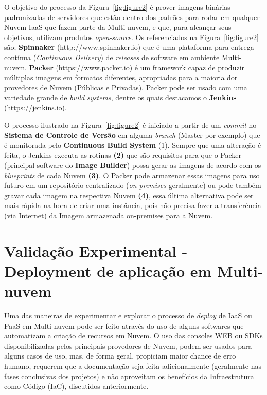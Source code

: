 \documentclass[12pt]{article}
\begin{document}
	O objetivo do processo da Figura~\ref{fig:figure2} é prover imagens binárias padronizadas de servidores que estão dentro dos padrões para rodar em qualquer Nuvem IaaS que fazem parte da Multi-nuvem, e que, para alcançar seus objetivos, utilizam produtos \textit{open-source}. Os referenciados na Figura~\ref{fig:figure2} são; \textbf{Spinnaker} (http://www.spinnaker.io) que é uma plataforma para entrega contínua (\textit{Continuous Delivery}) de \textit{releases} de software em ambiente Multi-nuvem. \textbf{Packer} (https://www.packer.io) é um framework capaz de produzir múltiplas imagens em formatos diferentes, apropriadas para a maioria dor provedores de Nuvem (Públicas e Privadas). Packer pode ser usado com uma variedade grande de \textit{build systems}, dentre os quais destacamos o \textbf{Jenkins} (https://jenkins.io).

	O processo ilustrado na Figura~\ref{fig:figure2} é iniciado a partir de um \textit{commit} no \textbf{Sistema de Controle de Versão} em alguma \textit{branch} (Master por exemplo) que é monitorada pelo \textbf{Continuous Build System} (1). Sempre que uma alteração é feita, o Jenkins executa as rotinas \textbf{(2)} que são requisitos para que o Packer (principal software do \textbf{Image Builder}) possa gerar as imagens de acordo com os \textit{blueprints} de cada Nuvem \textbf{(3)}. O Packer pode armazenar essas imagens para uso futuro em um repositório centralizado (\textit{on-premises} geralmente) ou pode também gravar cada imagem na respectiva Nuvem \textbf{(4)}, essa última alternativa pode ser mais rápida na hora de criar uma instância, pois não precisa fazer a transferência (via Internet) da Imagem armazenada on-premises para a Nuvem.
	
	\section{Validação Experimental - Deployment de aplicação em Multi-nuvem}
	
	Uma das maneiras de experimentar e explorar o processo de \textit{deploy} de IaaS ou PaaS em Multi-nuvem pode ser feito através do uso de alguns softwares que automatizam a criação de recursos em Nuvem. O uso das consoles WEB ou SDKs disponibilizadas pelos principais provedores de Nuvem, podem ser usados para alguns casos de uso, mas, de forma geral,  propiciam maior chance de erro humano, requerem que a documentação seja feita adicionalmente (geralmente nas fases conclusivas dos projetos) e não aproveitam os benefícios da Infraestrutura como Código (IaC), discutidos anteriormente.
	
\end{document}
